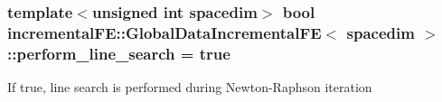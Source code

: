 \subsubsection[{\texorpdfstring{perform\+\_\+line\+\_\+search}{perform_line_search}}]{\setlength{\rightskip}{0pt plus 5cm}template$<$unsigned int spacedim$>$ bool {\bf incremental\+F\+E\+::\+Global\+Data\+Incremental\+FE}$<$ spacedim $>$\+::perform\+\_\+line\+\_\+search = true\hspace{0.3cm}{\ttfamily [private]}}\hypertarget{classincremental_f_e_1_1_global_data_incremental_f_e_a2253a9b142315cbccac38c8b8dc83824}{}\label{classincremental_f_e_1_1_global_data_incremental_f_e_a2253a9b142315cbccac38c8b8dc83824}
If true, line search is performed during Newton-\/\+Raphson iteration 
